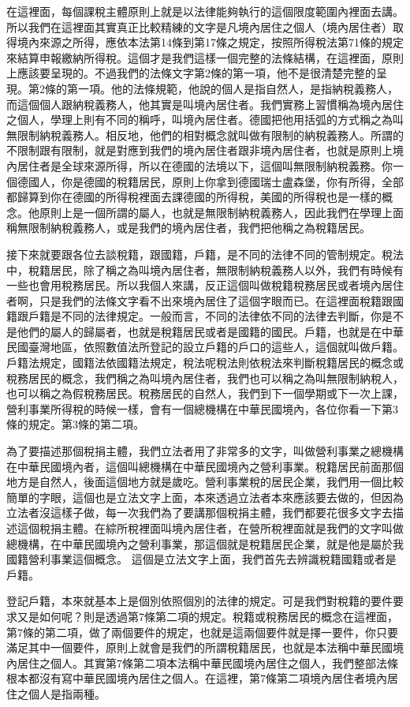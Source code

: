 \documentclass[oneside,sub3section]{ctexbook}
\begin{document}
在這裡面，每個課稅主體原則上就是以法律能夠執行的這個限度範圍內裡面去講。所以我們在這裡面其實真正比較精練的文字是凡境內居住之個人（境內居住者）取得境內來源之所得，應依本法第14條到第17條之規定，按照所得稅法第71條的規定來結算申報繳納所得稅。這個才是我們這樣一個完整的法條結構，在這裡面，原則上應該要呈現的。不過我們的法條文字第2條的第一項，他不是很清楚完整的呈現。第2條的第一項。他的法條規範，他說的個人是指自然人，是指納稅義務人，而這個個人跟納稅義務人，他其實是叫境內居住者。我們實務上習慣稱為境內居住之個人，學理上則有不同的稱呼，叫境內居住者。德國把他用括弧的方式稱之為叫無限制納稅義務人。相反地，他們的相對概念就叫做有限制的納稅義務人。所謂的不限制跟有限制，就是對應到我們的境內居住者跟非境內居住者，也就是原則上境內居住者是全球來源所得，所以在德國的法境以下，這個叫無限制納稅義務。你一個德國人，你是德國的稅籍居民，原則上你拿到德國瑞士盧森堡，你有所得，全部都歸算到你在德國的所得稅裡面去課德國的所得稅，美國的所得稅也是一樣的概念。他原則上是一個所謂的屬人，也就是無限制納稅義務人，因此我們在學理上面稱無限制納稅義務人，或是我們的境內居住者，我們把他稱之為稅籍居民。

接下來就要跟各位去談稅籍，跟國籍，戶籍，是不同的法律不同的管制規定。稅法中，稅籍居民，除了稱之為叫境內居住者，無限制納稅義務人以外，我們有時候有一些也會用稅務居民。所以我個人來講，反正這個叫做稅籍稅務居民或者境內居住者啊，只是我們的法條文字看不出來境內居住了這個字眼而已。在這裡面稅籍跟國籍跟戶籍是不同的法律規定。一般而言，不同的法律依不同的法律去判斷，你是不是他們的屬人的歸屬者，也就是稅籍居民或者是國籍的國民。戶籍，也就是在中華民國臺灣地區，依照數值法所登記的設立戶籍的戶口的這些人，這個就叫做戶籍。戶籍法規定，國籍法依國籍法規定，稅法呢稅法則依稅法來判斷稅籍居民的概念或稅務居民的概念，我們稱之為叫境內居住者，我們也可以稱之為叫無限制納稅人，也可以稱之為假稅務居民。稅務居民的自然人，我們到下一個學期或下一次上課，營利事業所得稅的時候一樣，會有一個總機構在中華民國境內，各位你看一下第3條的規定。第3條的第二項。

為了要描述那個稅捐主體，我們立法者用了非常多的文字，叫做營利事業之總機構在中華民國境內者，這個叫總機構在中華民國境內之營利事業。稅籍居民前面那個地方是自然人，後面這個地方就是歲吃。營利事業稅的居民企業，我們用一個比較簡單的字眼，這個也是立法文字上面，本來透過立法者本來應該要去做的，但因為立法者沒這樣子做，每一次我們為了要講那個稅捐主體，我們都要花很多文字去描述這個稅捐主體。在綜所稅裡面叫境內居住者，在營所稅裡面就是我們的文字叫做總機構，在中華民國境內之營利事業，那這個就是稅籍居民企業，就是他是屬於我國籍營利事業這個概念。
這個是立法文字上面，我們首先去辨識稅籍國籍或者是戶籍。

登記戶籍，本來就基本上是個別依照個別的法律的規定。可是我們對稅籍的要件要求又是如何呢？則是透過第7條第二項的規定。稅籍或稅務居民的概念在這裡面，第7條的第二項，做了兩個要件的規定，也就是這兩個要件就是擇一要件，你只要滿足其中一個要件，原則上就會是我們的所謂稅籍居民，也就是本法稱中華民國境內居住之個人。其實第7條第二項本法稱中華民國境內居住之個人，我們整部法條根本都沒有寫中華民國境內居住之個人。在這裡，第7條第二項境內居住者境內居住之個人是指兩種。
\end{document}
